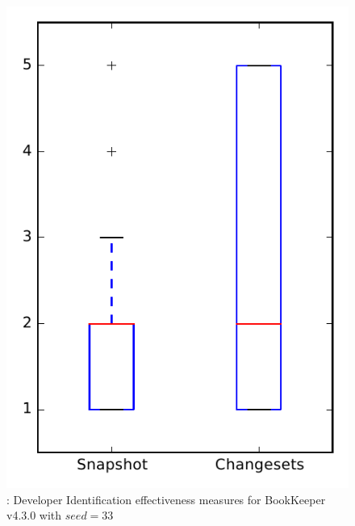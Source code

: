 
\begin{figure}
\centering
\includegraphics[height=0.4\textheight]{figures/dit_seed/rq1_bookkeeper_33}
\caption{\rtwo: Developer Identification effectiveness measures for BookKeeper v4.3.0 with $seed=33$}
\label{fig:dit_seed:rq1:bookkeeper}
\end{figure}
